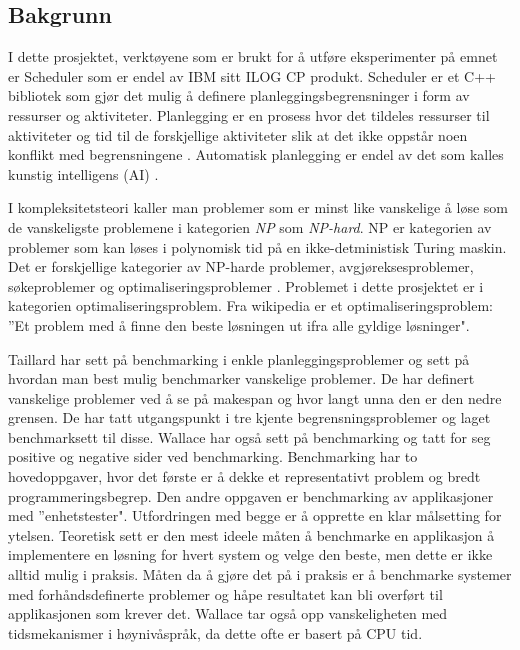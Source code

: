 \subsection{Bakgrunn}
I dette prosjektet, verktøyene som er brukt for å utføre eksperimenter på emnet er Scheduler som er endel av IBM sitt ILOG CP produkt. Scheduler er et C++ bibliotek som gjør det mulig å definere planleggingsbegrensninger i form av ressurser og aktiviteter. Planlegging er en prosess hvor det tildeles ressurser til aktiviteter og tid til de forskjellige aktiviteter slik at det ikke oppstår noen konflikt med begrensningene \cite{Pape94implementationof}. Automatisk planlegging er endel av det som kalles kunstig intelligens (AI) .

I kompleksitetsteori \cite{compcomplextheory} kaller man problemer som er minst like vanskelige å løse som de vanskeligste problemene i kategorien \textit{NP} som \textit{NP-hard}. NP er kategorien av problemer som kan løses i polynomisk tid på en ikke-detministisk Turing  maskin. Det er forskjellige kategorier av NP-harde problemer, avgjøreksesproblemer, søkeproblemer og optimaliseringsproblemer \cite{nphardwikipedia}. Problemet i dette prosjektet er i kategorien optimaliseringsproblem. Fra wikipedia \cite{optimizationproblemwiki} er et optimaliseringsproblem: ''Et problem med å finne den beste løsningen ut ifra alle gyldige løsninger".

Taillard \cite{Taillard1993278} har sett på benchmarking i enkle planleggingsproblemer og sett på hvordan man best mulig benchmarker vanskelige problemer. De har definert vanskelige problemer ved å se på makespan og hvor langt unna den er den nedre grensen. De har tatt utgangspunkt i tre kjente begrensningsproblemer og laget benchmarksett til disse. Wallace \cite{Wallace:2004:BCL:956860.956861} har også sett på benchmarking og tatt for seg positive og negative sider ved benchmarking. Benchmarking har to hovedoppgaver, hvor det første er å dekke et representativt problem og bredt programmeringsbegrep. Den andre oppgaven er benchmarking av applikasjoner med ''enhetstester". Utfordringen med begge er å opprette en klar målsetting for ytelsen. Teoretisk sett er den mest ideele måten å benchmarke en applikasjon å implementere en løsning for hvert system og velge den beste, men dette er ikke alltid mulig i praksis. Måten da å gjøre det på i praksis er å benchmarke systemer med forhåndsdefinerte problemer og håpe resultatet kan bli overført til applikasjonen som krever det. Wallace tar også opp vanskeligheten med tidsmekanismer i høynivåspråk, da dette ofte er basert på CPU tid.